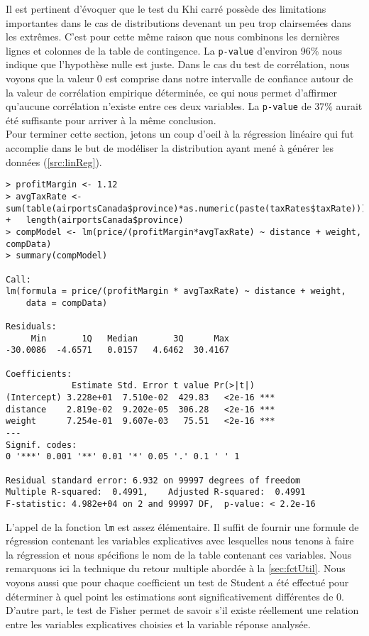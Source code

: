 \vspace{\baselineskip}
Il est pertinent d'évoquer que le test du Khi carré possède des limitations importantes dans le cas de distributions devenant un peu trop clairsemées dans les extrêmes. C'est pour cette même raison que nous combinons les dernières lignes et colonnes de la table de contingence. \cite{Rfunction:chisqWarning} La \texttt{p-value} d'environ 96\% nous indique que l'hypothèse nulle est juste. Dans le cas du test de corrélation, nous voyons que la valeur 0 est comprise dans notre intervalle de confiance autour de la valeur de corrélation empirique déterminée, ce qui nous permet d'affirmer qu'aucune corrélation n'existe entre ces deux variables. La \texttt{p-value} de 37\% aurait été suffisante pour arriver à la même conclusion. \\

Pour terminer cette section, jetons un coup d'oeil à la régression linéaire qui fut accomplie dans le but de modéliser la distribution ayant mené à générer les données (\autoref{src:linReg}).

\begin{lstlisting}[caption = Régression linéaire sur données empiriques,label=src:linReg]
> profitMargin <- 1.12
> avgTaxRate <- sum(table(airportsCanada$province)*as.numeric(paste(taxRates$taxRate)))/
+   length(airportsCanada$province)
> compModel <- lm(price/(profitMargin*avgTaxRate) ~ distance + weight, compData)
> summary(compModel)

Call:
lm(formula = price/(profitMargin * avgTaxRate) ~ distance + weight, 
    data = compData)

Residuals:
     Min       1Q   Median       3Q      Max 
-30.0086  -4.6571   0.0157   4.6462  30.4167 

Coefficients:
             Estimate Std. Error t value Pr(>|t|)    
(Intercept) 3.228e+01  7.510e-02  429.83   <2e-16 ***
distance    2.819e-02  9.202e-05  306.28   <2e-16 ***
weight      7.254e-01  9.607e-03   75.51   <2e-16 ***
---
Signif. codes:  
0 '***' 0.001 '**' 0.01 '*' 0.05 '.' 0.1 ' ' 1

Residual standard error: 6.932 on 99997 degrees of freedom
Multiple R-squared:  0.4991,	Adjusted R-squared:  0.4991 
F-statistic: 4.982e+04 on 2 and 99997 DF,  p-value: < 2.2e-16
\end{lstlisting}

\vspace{\baselineskip}
L'appel de la fonction \texttt{lm} \cite{Rfunction:lm} est assez élémentaire. Il suffit de fournir une formule de régression contenant les variables explicatives avec lesquelles nous tenons à faire la régression et nous spécifions le nom de la table contenant ces variables. Nous remarquons ici la technique du retour multiple abordée à la \autoref{sec:fctUtil}. Nous voyons aussi que pour chaque coefficient un test de Student a été effectué pour déterminer à quel point les estimations sont significativement différentes de 0. D'autre part, le test de Fisher permet de savoir s'il existe réellement une relation entre les variables explicatives choisies et la variable réponse analysée. \cite{outputLM} \\

